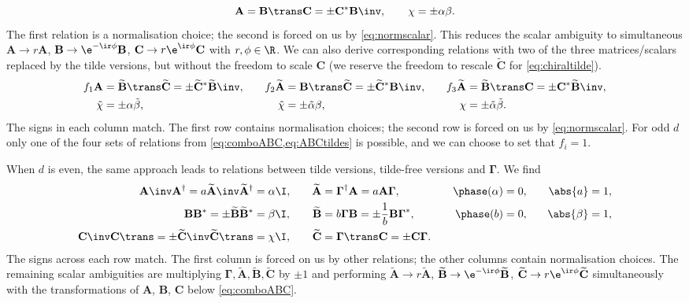 \documentclass[11pt]{article}
\newcommand{\Gammab}{\boldsymbol{\Gamma}}
\newcommand{\A}{\mathbf{A}}
\newcommand{\B}{\mathbf{B}}
\renewcommand{\C}{\mathbf{C}}
\newcommand{\At}{\widetilde{\A}}
\newcommand{\Bt}{\widetilde{\B}}
\newcommand{\Ct}{\widetilde{\C}}
\newcommand{\alphat}{\tilde{\alpha}}
\newcommand{\betat}{\tilde{\beta}}
\newcommand{\chit}{\tilde{\chi}}
\begin{document}
%
\begin{equation}\label{eq:comboABC}
  \A = \B\trans \C = \pm \C^\ast \B\inv, \qquad
  \chi = \pm \alpha \beta.
\end{equation}
%
The first relation is a normalisation choice; the second is forced on us by \cref{eq:normscalar}.
This reduces the scalar ambiguity to simultaneous \( \A \rightarrow r \A \),
\( \B \rightarrow \e^{-\ir\phi} \B \), \( \C \rightarrow r\e^{\ir\phi} \C \)
with \( r, \phi \in \R \).
We can also derive corresponding relations with two of the three matrices/scalars replaced by the tilde versions, but without the freedom to scale $\C$ (we reserve the freedom to rescale $\Ct$ for \cref{eq:chiraltilde}).
%
\begin{equation}\label{eq:ABCtildes}
\begin{aligned}
  f_1 \A &= \Bt\trans \Ct = \pm \Ct^\ast \Bt\inv, &\quad
  f_2 \At &= \B\trans \Ct = \pm \Ct^\ast \B\inv, &\quad
  f_3 \At &= \Bt\trans \C = \pm \C^\ast \Bt\inv, \\
  {\chit} &= \pm {\alpha} {\betat}, &
  {\chit} &= \pm {\alphat} {\beta}, &
  {\chi} &= \pm {\alphat} {\betat}.
\end{aligned}
\end{equation}
%
The signs in each column match.
The first row contains normalisation choices; the second row is forced on us by \cref{eq:normscalar}.
For odd $d$ only one of the four sets of relations from \cref{eq:comboABC,eq:ABCtildes} is possible, and we can choose to set that $f_i = 1$.

When $d$ is even, the same approach leads to relations between tilde versions, tilde-free versions and $\Gammab$.
We find
%
\begin{equation}\label{eq:chiraltilde}
\begin{aligned}
  \A\inv \A^\dag = a \At\inv \At^\dag &= \alpha \I, &\quad
  \At &= \Gammab^\dag \A = a \A \Gammab,            &\quad
  \phase(\alpha) &= 0,                              &\quad
  \abs{a} &= 1, \\
  \B \B^\ast = \pm \Bt \Bt^\ast &= \beta \I,             &
  \Bt &= b \Gammab \B = \pm \frac{1}{b} \B \Gammab^\ast, &
  \phase(b) &= 0,                                        &
  \abs{\beta} &= 1, \\
  \C\inv \C\trans = \pm \Ct\inv \Ct\trans &= \chi \I,    &
  \Ct &= \Gammab\trans \C = \pm \C \Gammab.              &
\end{aligned}
\end{equation}
%
The signs across each row match.
The first column is forced on us by other relations; the other columns contain normalisation choices.
The remaining scalar ambiguities are multiplying $\Gammab,\At,\Bt,\Ct$ by $\pm1$
and performing \( \At \rightarrow r \At \), \( \Bt \rightarrow \e^{-\ir\phi} \Bt \),
\( \Ct \rightarrow r\e^{\ir\phi} \Ct \) simultaneously with the transformations of $\A$, $\B$, $\C$ below \cref{eq:comboABC}.
\end{document}
